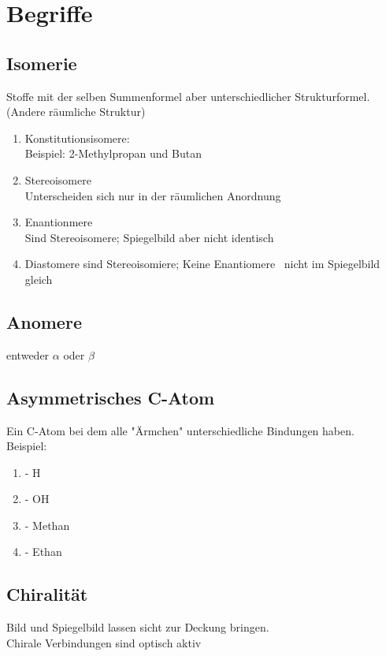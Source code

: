 
\section{Begriffe} \label{sec:begriffe}
\subsection{Isomerie}
Stoffe mit der selben Summenformel aber unterschiedlicher Strukturformel. (Andere räumliche Struktur)
\begin{enumerate}
    \item Konstitutionsisomere: \\
        Beispiel: 2-Methylpropan und Butan

    \item Stereoisomere \\
        Unterscheiden sich nur in der räumlichen Anordnung
    \item Enantionmere \\
        Sind Stereoisomere; Spiegelbild aber nicht identisch
    \item Diastomere
        sind Stereoisomiere; Keine Enantiomere \textrightarrow\ nicht im Spiegelbild gleich

\end{enumerate}

\subsection{Anomere}
entweder $\alpha$ oder $\beta$

\subsection{Asymmetrisches C-Atom}
Ein C-Atom bei dem alle "Ärmchen" unterschiedliche Bindungen haben. \\
Beispiel:
\begin{enumerate}
    \item - H
    \item - OH
    \item - Methan
    \item - Ethan
\end{enumerate}

\subsection{Chiralität}
Bild und Spiegelbild lassen sicht zur Deckung bringen. \\
Chirale Verbindungen sind optisch aktiv

